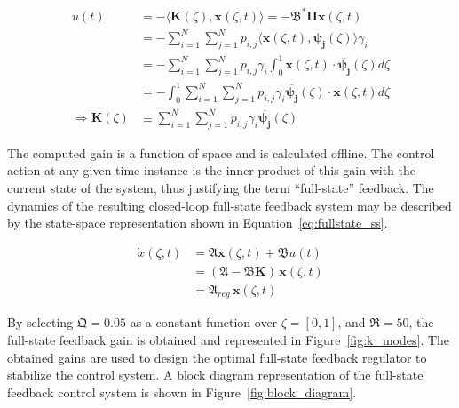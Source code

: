 \begin{equation} \label{eq:fullstate_gain}
    \begin{aligned}
        u(t) &= - \langle \bm{K}(\zeta), \bm{x}(\zeta, t) \rangle = - \mathfrak{B}^* \mathbf{\Pi} \bm{x}(\zeta, t) \\
        &= - \sum_{i=1}^N\sum_{j=1}^N p_{i,j} \langle \bm{x}(\zeta, t), \bm{\psi_j}(\zeta) \rangle \gamma_i \\
        &= - \sum_{i=1}^N\sum_{j=1}^N p_{i,j} \gamma_i \int_0^1 \bm{x}(\zeta, t) \cdot \overline{\bm{\psi_j}}(\zeta) d\zeta \\
        &= - \int_0^1 \sum_{i=1}^N\sum_{j=1}^N p_{i,j} \gamma_i \overline{\bm{\psi_j}}(\zeta) \cdot \bm{x}(\zeta, t) d\zeta \\
        \Rightarrow \bm{K}(\zeta) &\equiv \sum_{i=1}^N\sum_{j=1}^N p_{i,j} \gamma_i \overline{\bm{\psi_j}}(\zeta)
    \end{aligned}
\end{equation}

The computed gain is a function of space and is calculated offline. The control action at any given time instance is the inner product of this gain with the current state of the system, thus justifying the term ``full-state'' feedback. The dynamics of the resulting closed-loop full-state feedback system may be described by the state-space representation shown in Equation~\ref{eq:fullstate_ss}.

\begin{equation}
    \begin{aligned} \label{eq:fullstate_ss}
        \dot{x}(\zeta, t) &= \mathfrak{A} \bm{x}(\zeta, t) + \mathfrak{B} u(t) \\
        &= (\mathfrak{A} - \mathfrak{B} \bm{K}) \, \bm{x}(\zeta, t) \\
        &= \mathfrak{A}_{reg} \, \bm{x}(\zeta, t)
    \end{aligned}
\end{equation}

By selecting $\mathfrak{Q} = 0.05$ as a constant function over $\zeta = [0,1]$, and $\mathfrak{R} = 50$, the full-state feedback gain is obtained and represented in Figure~\ref{fig:k_modes}. The obtained gains are used to design the optimal full-state feedback regulator to stabilize the control system. A block diagram representation of the full-state feedback control system is shown in Figure~\ref{fig:block_diagram}.


